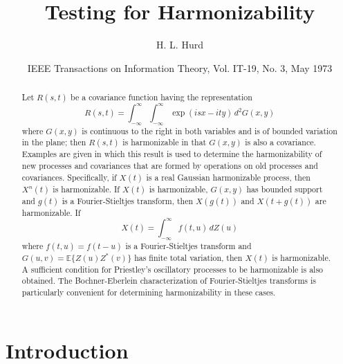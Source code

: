 \documentclass[11pt]{article}
\title{Testing for Harmonizability}
\author{H. L. Hurd}
\date{IEEE Transactions on Information Theory, Vol. IT-19, No. 3, May 1973}
\theoremstyle{plain}
\theoremstyle{definition}
\theoremstyle{remark}
\begin{document}
\maketitle

\begin{abstract}
Let $R(s,t)$ be a covariance function having the representation
\begin{equation}
R(s,t) = \int_{-\infty}^{\infty} \int_{-\infty}^{\infty} \exp(isx - ity) \, d^2G(x,y)
\label{eq:covariance-harmonizable}
\end{equation}
where $G(x,y)$ is continuous to the right in both variables and is of bounded variation in the plane; then $R(s,t)$ is harmonizable in that $G(x,y)$ is also a covariance. Examples are given in which this result is used to determine the harmonizability of new processes and covariances that are formed by operations on old processes and covariances. Specifically, if $X(t)$ is a real Gaussian harmonizable process, then $X^n(t)$ is harmonizable. If $X(t)$ is harmonizable, $G(x,y)$ has bounded support and $g(t)$ is a Fourier-Stieltjes transform, then $X(g(t))$ and $X(t + g(t))$ are harmonizable. If
\begin{equation}
X(t) = \int_{-\infty}^{\infty} f(t,u) \, dZ(u)
\label{eq:moving-average}
\end{equation}
where $f(t,u) = f(t-u)$ is a Fourier-Stieltjes transform and $G(u,v) = \mathbb{E}\{Z(u)Z^*(v)\}$ has finite total variation, then $X(t)$ is harmonizable. A sufficient condition for Priestley's oscillatory processes to be harmonizable is also obtained. The Bochner-Eberlein characterization of Fourier-Stieltjes transforms is particularly convenient for determining harmonizability in these cases.
\end{abstract}

\section{Introduction}
\end{document}
